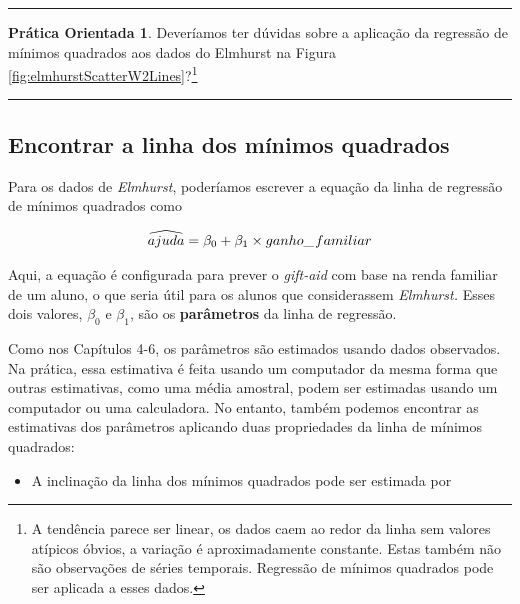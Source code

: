 \documentclass[
]{book}
\providecommand{\tightlist}{%
  \setlength{\itemsep}{0pt}\setlength{\parskip}{0pt}}
\theoremstyle{definition}
\theoremstyle{definition}
\theoremstyle{definition}
\newtheorem{exercise}{Prática Orientada}[chapter]
\theoremstyle{definition}
\theoremstyle{remark}
\begin{document}
\begin{center}\rule{0.5\linewidth}{0.5pt}\end{center}

\begin{exercise}
\protect\hypertarget{exr:unnamed-chunk-273}{}{\label{exr:unnamed-chunk-273} }Deveríamos ter dúvidas sobre a aplicação da regressão de mínimos quadrados aos dados do Elmhurst na Figura \ref{fig:elmhurstScatterW2Lines}?\footnote{A tendência parece ser linear, os dados caem ao redor da linha sem valores atípicos óbvios, a variação é aproximadamente constante. Estas também não são observações de séries temporais. Regressão de mínimos quadrados pode ser aplicada a esses dados.}
\end{exercise}

\begin{center}\rule{0.5\linewidth}{0.5pt}\end{center}

\hypertarget{findingTheLeastSquaresLineSection}{%
\subsection{Encontrar a linha dos mínimos quadrados}\label{findingTheLeastSquaresLineSection}}

Para os dados de \emph{Elmhurst}, poderíamos escrever a equação da linha de regressão de mínimos quadrados como

\begin{eqnarray*}
\widehat{ajuda} = \beta_0 + \beta_{1}\times ganho\_\hspace{0.3mm}familiar
\end{eqnarray*}

Aqui, a equação é configurada para prever o \emph{gift-aid} com base na renda familiar de um aluno, o que seria útil para os alunos que considerassem \emph{Elmhurst.} Esses dois valores, \(\beta_0\) e \(\beta_1\), são os \textbf{parâmetros} da linha de regressão.

Como nos Capítulos 4-6, os parâmetros são estimados usando dados observados. Na prática, essa estimativa é feita usando um computador da mesma forma que outras estimativas, como uma média amostral, podem ser estimadas usando um computador ou uma calculadora. No entanto, também podemos encontrar as estimativas dos parâmetros aplicando duas propriedades da linha de mínimos quadrados:

\begin{itemize}
\tightlist
\item
  A inclinação da linha dos mínimos quadrados pode ser estimada por
\end{itemize}
\end{document}
